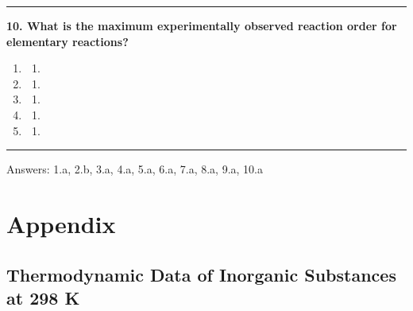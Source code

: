 \documentclass[
  9pt,
]{extbook}
\providecommand{\tightlist}{%
  \setlength{\itemsep}{0pt}\setlength{\parskip}{0pt}}
\theoremstyle{definition}
\theoremstyle{definition}
\theoremstyle{definition}
\theoremstyle{remark}
\begin{document}
\begin{center}\rule{0.5\linewidth}{0.5pt}\end{center}

\textbf{10. What is the maximum experimentally observed reaction order for elementary reactions?}

\begin{enumerate}
\def\labelenumi{\alph{enumi}.}
\item
  \begin{enumerate}
  \def\labelenumii{\arabic{enumii}.}
  \setcounter{enumii}{2}
  \tightlist
  \item
  \end{enumerate}
\item
  \begin{enumerate}
  \def\labelenumii{\arabic{enumii}.}
  \setcounter{enumii}{1}
  \tightlist
  \item
  \end{enumerate}
\item
  \begin{enumerate}
  \def\labelenumii{\arabic{enumii}.}
  \setcounter{enumii}{3}
  \tightlist
  \item
  \end{enumerate}
\item
  \begin{enumerate}
  \def\labelenumii{\arabic{enumii}.}
  \setcounter{enumii}{4}
  \tightlist
  \item
  \end{enumerate}
\item
  \begin{enumerate}
  \def\labelenumii{\arabic{enumii}.}
  \tightlist
  \item
  \end{enumerate}
\end{enumerate}

\begin{center}\rule{0.5\linewidth}{0.5pt}\end{center}

Answers: 1.a, 2.b, 3.a, 4.a, 5.a, 6.a, 7.a, 8.a, 9.a, 10.a

\renewcommand*{\standardstate}{{-\kern-6pt{\ominus}\kern-6pt-}}

\hypertarget{appendix}{%
\chapter{Appendix}\label{appendix}}

\hypertarget{thermodynamic-data-of-inorganic-substances-at-298-k}{%
\section{Thermodynamic Data of Inorganic Substances at 298 K}\label{thermodynamic-data-of-inorganic-substances-at-298-k}}
\end{document}
